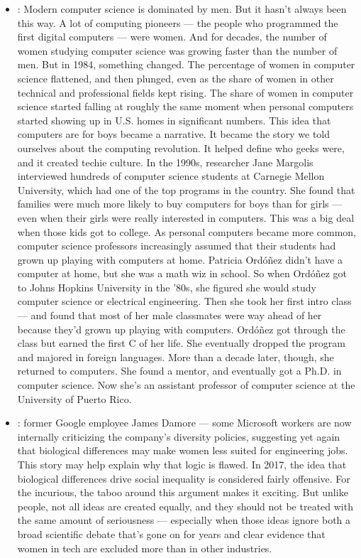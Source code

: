\documentclass[12pt,a4paper]{article}
\begin{document}
\begin{enumerate}
\begin{itemize}
      \item {}: Modern computer science is dominated by men. But it hasn't always been this way. A lot of computing pioneers — the people who programmed the first digital computers — were women. And for decades, the number of women studying computer science was growing faster than the number of men. But in 1984, something changed. The percentage of women in computer science flattened, and then plunged, even as the share of women in other technical and professional fields kept rising. The share of women in computer science started falling at roughly the same moment when personal computers started showing up in U.S. homes in significant numbers. This idea that computers are for boys became a narrative. It became the story we told ourselves about the computing revolution. It helped define who geeks were, and it created techie culture. In the 1990s, researcher Jane Margolis interviewed hundreds of computer science students at Carnegie Mellon University, which had one of the top programs in the country. She found that families were much more likely to buy computers for boys than for girls — even when their girls were really interested in computers. This was a big deal when those kids got to college. As personal computers became more common, computer science professors increasingly assumed that their students had grown up playing with computers at home. Patricia Ordóñez didn't have a computer at home, but she was a math wiz in school. So when Ordóñez got to Johns Hopkins University in the '80s, she figured she would study computer science or electrical engineering. Then she took her first intro class — and found that most of her male classmates were way ahead of her because they'd grown up playing with computers. Ordóñez got through the class but earned the first C of her life. She eventually dropped the program and majored in foreign languages. More than a decade later, though, she returned to computers. She found a mentor, and eventually got a Ph.D. in computer science. Now she's an assistant professor of computer science at the University of Puerto Rico.
      \item {}: former Google employee James Damore — some Microsoft workers are now internally criticizing the company’s diversity policies, suggesting yet again that biological differences may make women less suited for engineering jobs. This story may help explain why that logic is flawed. In 2017, the idea that biological differences drive social inequality is considered fairly offensive. For the incurious, the taboo around this argument makes it exciting. But unlike people, not all ideas are created equally, and they should not be treated with the same amount of seriousness — especially when those ideas ignore both a broad scientific debate that’s gone on for years and clear evidence that women in tech are excluded more than in other industries. \href{https://www.theverge.com/2017/8/16/16153740/tech-diversity-problem-science-history-explainer-inequality}{}

\end{itemize}
\end{enumerate}
\end{document}
